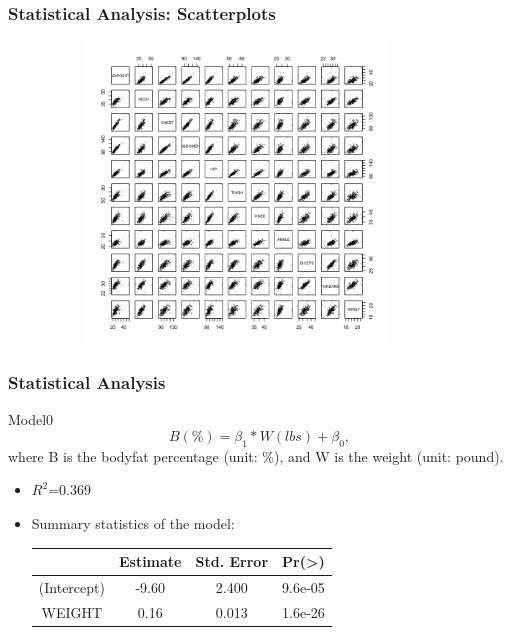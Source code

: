 \documentclass{beamer}
\begin{document}
\begin{frame}
\frametitle{Statistical Analysis: Scatterplots}
\begin{itemize}
\begin{figure}
\centering
\includegraphics[height=8cm,width=10cm]{pairsplot.png}
\label{2}
\end{figure}
\end{itemize}
\end{frame}
\begin{frame}
\frametitle{Statistical Analysis}

\begin{block}{Model0}
$$B(\%) = \beta_1*W (lbs) + \beta_0,$$
where B is the bodyfat percentage (unit: $\%$), and W is the weight (unit: pound).
\end{block}
\begin{itemize}
    \item $R^2$=0.369
    \item   Summary statistics of the model:
            \begin{table}
	        \centering
        	\begin{tabular}{cccc}  
	        	\toprule
	        	& Estimate &	Std. Error &		Pr(\textgreater\abs{t})\\  
	        	\midrule        %
	        	(Intercept) &	-9.60 &	2.400  &	9.6e-05 \\
	        	 WEIGHT &	0.16 &	0.013 &		1.6e-26 \\
	        	\bottomrule
        	\end{tabular}
        \end{table}
\end{itemize}









\end{frame}
\end{document}
